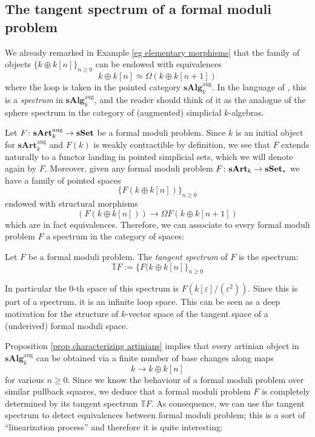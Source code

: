 \begin{refsection}
\section{The tangent spectrum of a formal moduli problem}

We already remarked in Example \ref{eg elementary morphisms} that the family of objects $\{k \oplus k[n]\}_{n \ge 0}$ can be endowed with equivalences
\[
k \oplus k[n] \simeq \Omega( k \oplus k[n+1] )
\]
where the loop is taken in the pointed category $\mathbf{sAlg}_k^{\mathrm{aug}}$. In the language of \cite{ha}, this is a \emph{spectrum} in $\mathbf{sAlg}_k^{\mathrm{aug}}$, and the reader should think of it as the analogue of the sphere spectrum in the category of (augmented) simplicial $k$-algebras.

Let $F \colon \mathbf{sArt}_k^{\mathrm{aug}} \to \mathbf{sSet}$ be a formal moduli problem. Since $k$ is an initial object for $\mathbf{sArt}_k^{\mathrm{aug}}$ and $F(k)$ is weakly contractible by definition, we see that $F$ extends naturally to a functor landing in pointed simplicial sets, which we will denote again by $F$. Moreover, given any formal moduli problem $F \colon \mathbf{sArt}_k \to \mathbf{sSet}_*$ we have a family of pointed spaces
\[
\{F(k \oplus k[n])\}_{n \ge 0}
\]
endowed with structural morphisms
\[
(F(k \oplus k[n])) \to \Omega F(k \oplus k[n+1])
\]
which are in fact equivalences. Therefore, we can associate to every formal moduli problem $F$ a spectrum in the category of spaces:

\begin{defin}
Let $F$ be a formal moduli problem. The \emph{tangent spectrum} of $F$ is the spectrum:
\[
\mathbb T F := \{F(k \oplus k[n]\}_{n \ge 0}
\]
\end{defin}

\begin{rmk}
In particular the $0$-th space of this spectrum is $F(k[\varepsilon]/(\varepsilon^2))$. Since this is part of a spectrum, it is an infinite loop space. This can be seen as a deep motivation for the structure of $k$-vector space of the tangent space of a (underived) formal moduli space.
\end{rmk}

Proposition \ref{prop characterizing artinians} implies that every artinian object in $\mathbf{sAlg}_k^{\mathrm{aug}}$ can be obtained via a finite number of base changes along maps
\[
k \to k \oplus k[n]
\]
for various $n \ge 0$. Since we know the behaviour of a formal moduli problem over similar pullback squares, we deduce that a formal moduli problem $F$ is completely determined by its tangent spectrum $\mathbb T F$. As consequence, we can use the tangent spectrum to detect equivalences between formal moduli problem; this is a sort of ``linearization process'' and therefore it is quite interesting:


\end{refsection}
